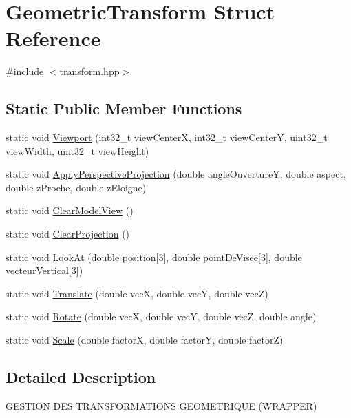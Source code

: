 \hypertarget{struct_geometric_transform}{\section{Geometric\+Transform Struct Reference}
\label{struct_geometric_transform}
}


{\ttfamily \#include $<$transform.\+hpp$>$}

\subsection*{Static Public Member Functions}
\begin{DoxyCompactItemize}
\item 
static void \hyperlink{struct_geometric_transform_a568c9eddb625b6d6a8e513efed1f08f5}{Viewport} (int32\+\_\+t view\+Center\+X, int32\+\_\+t view\+Center\+Y, uint32\+\_\+t view\+Width, uint32\+\_\+t view\+Height)
\item 
static void \hyperlink{struct_geometric_transform_a33174eb94f0ff24be29b8704c8ee99fd}{Apply\+Perspective\+Projection} (double angle\+Ouverture\+Y, double aspect, double z\+Proche, double z\+Eloigne)
\item 
static void \hyperlink{struct_geometric_transform_a1a64fda32bc67f6e414a08b55a904ad6}{Clear\+Model\+View} ()
\item 
static void \hyperlink{struct_geometric_transform_aa67fe82887937c72ee486521a3828c51}{Clear\+Projection} ()
\item 
static void \hyperlink{struct_geometric_transform_a11df6454b17b6ed7a9327cfd837cef0d}{Look\+At} (double position\mbox{[}3\mbox{]}, double point\+De\+Visee\mbox{[}3\mbox{]}, double vecteur\+Vertical\mbox{[}3\mbox{]})
\item 
static void \hyperlink{struct_geometric_transform_aa1ce970125c307eae8e67732abfc2223}{Translate} (double vec\+X, double vec\+Y, double vec\+Z)
\item 
static void \hyperlink{struct_geometric_transform_a6d5739ab72a5de90da8992dfb9d73cf2}{Rotate} (double vec\+X, double vec\+Y, double vec\+Z, double angle)
\item 
static void \hyperlink{struct_geometric_transform_a86dfbf0890a23aa7983b64cbd9fe6fd5}{Scale} (double factor\+X, double factor\+Y, double factor\+Z)
\end{DoxyCompactItemize}


\subsection{Detailed Description}
G\+E\+S\+T\+I\+O\+N D\+E\+S T\+R\+A\+N\+S\+F\+O\+R\+M\+A\+T\+I\+O\+N\+S G\+E\+O\+M\+E\+T\+R\+I\+Q\+U\+E (W\+R\+A\+P\+P\+E\+R) 

